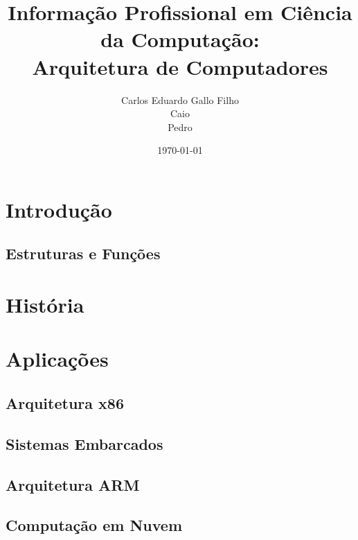 \documentclass{article}
\title{Informação Profissional em Ciência da Computação:\\
	Arquitetura de Computadores}
\author{Carlos Eduardo Gallo Filho \\
	Caio \\
	Pedro}
\date{\today}
\begin{document}
\maketitle

\section{Introdução}
\subsection{Estruturas e Funções}

\section{História}

\section{Aplicações}
\subsection{Arquitetura x86}
\subsection{Sistemas Embarcados}
\subsection{Arquitetura ARM}
\subsection{Computação em Nuvem}
\end{document}
